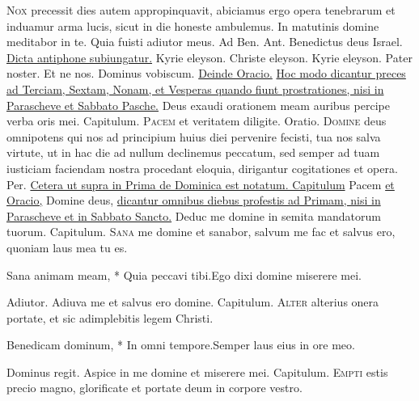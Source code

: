 \begin{multicols*}{2}
\lettrine[lines=2]{\zallmancaps \color{Blue} N}{ox} precessit dies autem appropinquavit, abiciamus ergo opera tenebrarum et induamur arma lucis, sicut in die honeste ambulemus.
\V In matutinis domine meditabor in te. \R Quia fuisti adiutor meus. {\color{Red} Ad Ben. Ant.} Benedictus deus Israel. \ul{Dicta antiphone subiungatur.} Kyrie eleyson. Christe eleyson. Kyrie eleyson. Pater noster. Et ne nos. Dominus vobiscum. \ul{Deinde Oracio.}
\newline \ul{Hoc modo dicantur preces ad Terciam, Sextam, Nonam, et Vesperas quando fiunt prostrationes, nisi in Parascheve et Sabbato Pasche.}
 Deus exaudi orationem meam auribus percipe verba oris mei. {\color{Red} Capitulum.}
\lettrine[lines=2]{\zallmancaps \color{Red} P}{acem} et veritatem diligite. {\color{Red} Oratio.}
\lettrine[lines=2]{\zallmancaps \color{Blue} D}{omine} deus omnipotens qui nos ad principium huius diei pervenire fecisti, tua nos salva virtute, ut in hac die ad nullum declinemus peccatum, sed semper ad tuam iusticiam faciendam nostra procedant eloquia, dirigantur cogitationes et opera. Per. \ul{Cetera ut supra in Prima de Dominica est notatum. Capitulum} Pacem \ul{et Oracio,} Domine deus, \ul{dicantur omnibus diebus profestis ad Primam, nisi in Parascheve et in Sabbato Sancto.}
 Deduc me domine in semita mandatorum tuorum. {\color{Red} Capitulum.}
\lettrine[lines=2]{\zallmancaps \color{Red} S}{ana} me domine et sanabor, salvum me fac et salvus ero, quoniam laus mea tu es.
\begin{responsory-breve}
{Sana animam meam, * Quia peccavi tibi.}{Ego dixi domine miserere mei.}
\end{responsory-breve}
\V Adiutor.
 Adiuva me et salvus ero domine. {\color{Red} Capitulum.}
\lettrine[lines=2]{\zallmancaps \color{Blue} A}{lter} alterius onera portate, et sic adimplebitis legem Christi.
\begin{responsory-breve}
{Benedicam dominum, * In omni tempore.}{Semper laus eius in ore meo.}
\end{responsory-breve}
\V Dominus regit.
 Aspice in me domine et miserere mei. {\color{Red} Capitulum.}
\lettrine[lines=2]{\zallmancaps \color{Red} E}{mpti} estis precio magno, glorificate et portate deum in corpore vestro.

\end{multicols*}
